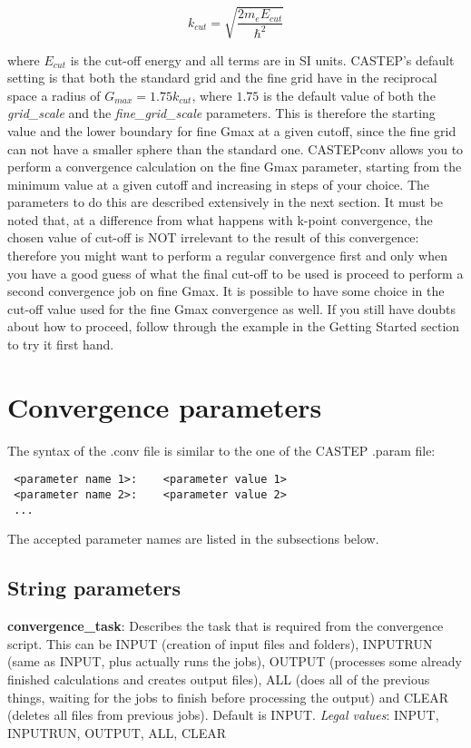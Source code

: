 \documentclass[10pt]{article}
\begin{document}
\begin{equation}
 k_{cut} = \sqrt{\frac{2m_eE_{cut}}{\hbar^2}}
\end{equation}

where $E_{cut}$ is the cut-off energy and all terms are in SI units. CASTEP's default setting is that both the standard grid and the fine grid have in the reciprocal space a radius of $G_{max} = 1.75k_{cut}$, where $1.75$ is the default value of both the \textit{grid\_scale} and the \textit{fine\_grid\_scale} parameters. This is therefore the starting value and the lower boundary for fine Gmax at a given cutoff, since the fine grid can not have a smaller sphere than the standard one.\newline
CASTEPconv allows you to perform a convergence calculation on the fine Gmax parameter, starting from the minimum value at a given cutoff and increasing in steps of your choice. The parameters to do this are described extensively in the next section. It must be noted that, at a difference from what happens with k-point convergence, the chosen value of cut-off is NOT irrelevant to the result of this convergence: therefore you might want to perform a regular convergence first and only when you have a good guess of what the final cut-off to be used is proceed to perform a second convergence job on fine Gmax. It is possible to have some choice in the cut-off value used for the fine Gmax convergence as well. If you still have doubts about how to proceed, follow through the example in the Getting Started section to try it first hand.

\section{Convergence parameters}

The syntax of the .conv file is similar to the one of the CASTEP .param file:

\begin{lstlisting}
 <parameter name 1>:    <parameter value 1>
 <parameter name 2>:    <parameter value 2>
 ...
\end{lstlisting}

The accepted parameter names are listed in the subsections below.

\subsection{String parameters}

\textbf{convergence\_task}: Describes the task that is required from the 
convergence script. This can be INPUT (creation of input files and folders), 
INPUTRUN (same as INPUT, plus actually runs the jobs), OUTPUT (processes some 
already finished calculations and creates output files), ALL (does all of the 
previous things, waiting for the jobs to finish before processing the output) and CLEAR (deletes all files from previous jobs).\newline
Default is INPUT.\newline
\textit{Legal values}: INPUT, INPUTRUN, OUTPUT, ALL, CLEAR\newline
\end{document}
